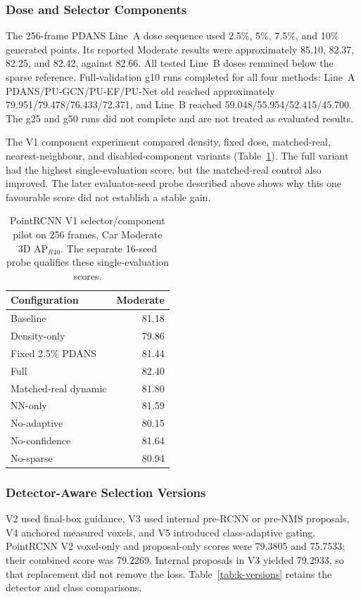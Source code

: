 \subsubsection{Dose and Selector Components}
The 256-frame PDANS Line~A dose sequence used 2.5\%, 5\%, 7.5\%,
and 10\% generated points. Its reported Moderate results were
approximately 85.10, 82.37, 82.25, and 82.42, against 82.66.
All tested Line~B doses remained below the sparse reference.
Full-validation g10 runs completed for all four methods:
Line~A PDANS/PU-GCN/PU-EF/PU-Net old reached approximately
79.951/79.478/76.433/72.371, and Line~B reached
59.048/55.954/52.415/45.700. The g25 and g50 runs did not complete
and are not treated as evaluated results.

The V1 component experiment compared density, fixed dose, matched-real,
nearest-neighbour, and disabled-component variants
(Table~\ref{tab:k-components}). The full variant had the highest
single-evaluation score, but the matched-real control also improved.
The later evaluator-seed probe described above shows why this one
favourable score did not establish a stable gain.

\begin{table}[!t]\centering\setlength{\tabcolsep}{4pt}
\begin{tabular}{lr}\toprule
Configuration & Moderate\\\midrule
Baseline & 81.18\\
Density-only & 79.86\\
Fixed 2.5\% PDANS & 81.44\\
Full & 82.40\\
Matched-real dynamic & 81.80\\
NN-only & 81.59\\
No-adaptive & 80.15\\
No-confidence & 81.64\\
No-sparse & 80.94\\
\bottomrule\end{tabular}
\caption{PointRCNN V1 selector/component pilot on 256 frames, Car Moderate 3D AP$_{R40}$. The separate 16-seed probe qualifies these single-evaluation scores.}\label{tab:k-components}\end{table}

\subsubsection{Detector-Aware Selection Versions}
V2 used final-box guidance, V3 used internal pre-RCNN or pre-NMS
proposals, V4 anchored measured voxels, and V5 introduced class-adaptive
gating. PointRCNN V2 voxel-only and proposal-only scores were
79.3805 and 75.7533; their combined score was 79.2269.
Internal proposals in V3 yielded 79.2933, so that replacement did
not remove the loss. Table~\ref{tab:k-versions} retains the detector
and class comparisons.

